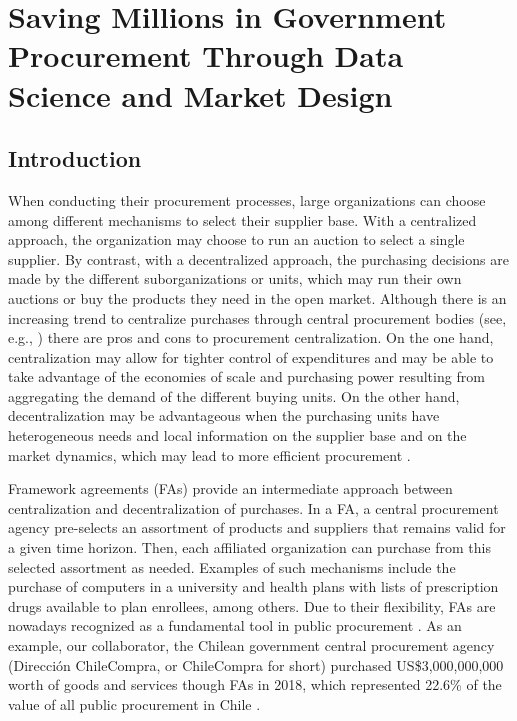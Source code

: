 \chapter{Saving Millions in Government Procurement Through Data Science and Market Design}

\section{Introduction}


When conducting their procurement processes, large organizations can choose among different mechanisms to select their supplier base. With a centralized approach, the organization may choose to run an auction to select a single supplier. By contrast, with a decentralized approach, the purchasing decisions are made by the different suborganizations or units, which may run their own auctions or buy the products they need in the open market. Although there is an increasing trend to centralize purchases through central procurement bodies (see,  e.g., \cite{oecd2019reforming}) there are pros and cons to procurement centralization. On the one hand, centralization may allow for  tighter control of expenditures and may be able to take advantage of the economies of scale and purchasing power resulting from aggregating the demand of the different buying units. On the other hand, decentralization may be advantageous when the purchasing units have heterogeneous needs and local information on the supplier base and on the market dynamics, which may lead to more efficient procurement \citep{dimitri2006handbook}.

Framework agreements (FAs)  provide an intermediate approach between  centralization and decentralization of purchases. In a FA, a central procurement agency pre-selects an assortment of products and suppliers that remains valid for a given time horizon. Then, each affiliated organization can purchase from this selected assortment as needed. Examples of such mechanisms include the purchase of computers in a university and health plans with lists of prescription drugs available to plan enrollees, among others. Due to their flexibility, FAs are nowadays  recognized as a fundamental tool in public procurement \citep{albano2016law}. {As an example, our collaborator, the Chilean government central procurement agency (Direcci\'on ChileCompra, or ChileCompra for short) purchased US\$3,000,000,000 worth of goods and services though FAs in 2018, which represented 22.6\% of the value of all public procurement in Chile} \citep{datosabiertos}.%


